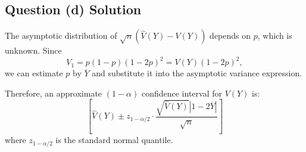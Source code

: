 \documentclass{article}
\begin{document}
\subsection{Question (d) Solution}
The asymptotic distribution of $\sqrt{n} (\widehat{V}(Y) - V(Y))$ depends on $p$, which is unknown. Since
\[
V_1 = p(1 - p)(1 - 2p)^2 = V(Y)(1 - 2p)^2,
\]
we can estimate $p$ by $\overline{Y}$ and substitute it into the asymptotic variance expression.

Therefore, an approximate $(1 - \alpha)$ confidence interval for $V(Y)$ is:
\[
\left[ \widehat{V}(Y) \pm z_{1 - \alpha/2} \cdot \frac{\sqrt{\widehat{V}(Y)}|1 - 2\overline{Y}|}{\sqrt{n}} \right]
\]
where $z_{1 - \alpha/2}$ is the standard normal quantile.
\end{document}
